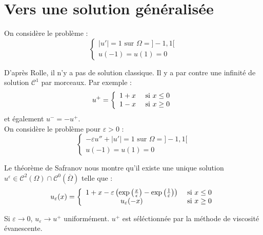 \section{Vers une solution généralisée}
On considère le problème :
\[\left\{ \begin{array}{c}
	|u'|=1 \text{ sur } \Omega=]-1,1[\\
	u(-1)=u(1)=0
\end{array}\right.\]

D'après Rolle, il n'y a pas de solution classique. Il y a par contre une infinité de solution $\mathscr{C}^1$ par morceaux.
Par exemple : \[u^+=\left\{ \begin{array}{c c c}
	1+x &\text{ si } x\leq 0\\
	1-x &\text{ si } x\geq 0
\end{array}\right.\]
et également $u^-=-u^+$.\\
On considère le problème pour $\varepsilon>0$ :
\[\left\{ \begin{array}{c}
	-\varepsilon u''+|u'|=1 \text{ sur } \Omega=]-1,1[\\
	u(-1)=u(1)=0
\end{array}\right.\]

Le théorème de Safranov nous montre qu'il existe une unique solution $u^\varepsilon\in\mathscr{C}^2(\Omega)\cap\mathscr{C}^0(\overline{\Omega})$ telle que :
\[u_\varepsilon(x)=\left\{ \begin{array}{c c c}
	1+x-\varepsilon\left(\exp\left(\frac{x}{\epsilon}\right)-\exp\left(\frac{1}{\varepsilon}\right)\right) &\text{ si } x\leq 0\\
	u_\varepsilon(-x) &\text{ si } x\geq 0
\end{array}\right.\]

Si $\varepsilon\to 0$, $u_\varepsilon\to u^+$ uniformément. $u^+$ est séléctionnée par la méthode de viscosité évanescente.


